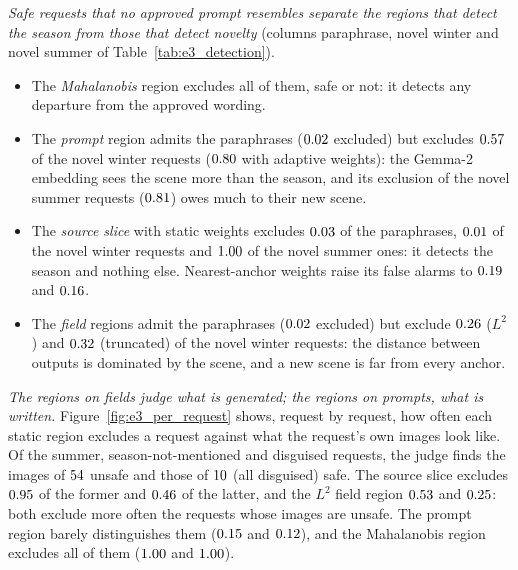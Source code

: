 \documentclass{article}
\theoremstyle{plain}
\theoremstyle{remark}
\begin{document}
\emph{Safe requests that no approved prompt resembles separate the regions that detect the season from those that detect
novelty} (columns paraphrase, novel winter and novel summer of Table~\ref{tab:e3_detection}).
\begin{itemize}
\item The \emph{Mahalanobis} region excludes all of them, safe or not: it detects any departure from the approved wording.
\item The \emph{prompt} region admits the paraphrases ($0.02$ excluded) but excludes $0.57$ of the novel winter
requests ($0.80$ with adaptive weights): the Gemma-2 embedding sees the scene more than the season, and its exclusion of the
novel summer requests ($0.81$) owes much to their new scene.
\item The \emph{source slice} with static weights excludes $0.03$ of the paraphrases, $0.01$ of the novel winter
requests and $1.00$ of the novel summer ones: it detects the season and nothing else. Nearest-anchor weights raise its false
alarms to $0.19$ and $0.16$.
\item The \emph{field} regions admit the paraphrases ($0.02$ excluded) but exclude $0.26$ ($L^2$) and $0.32$
(truncated) of the novel winter requests: the distance between outputs is dominated by the scene, and a new scene is far from every
anchor.
\end{itemize}

\emph{The regions on fields judge what is generated; the regions on prompts, what is written.} Figure~\ref{fig:e3_per_request}
shows, request by request, how often each static region excludes a request against what the request's own images look like. Of the
summer, season-not-mentioned and disguised requests, the judge finds the images of $54$ unsafe and those of $10$ (all
disguised) safe. The source slice excludes $0.95$ of the former and $0.46$ of the latter, and the $L^2$ field region
$0.53$ and $0.25$: both exclude more often the requests whose images are unsafe. The prompt region barely distinguishes
them ($0.15$ and $0.12$), and the Mahalanobis region excludes all of them ($1.00$ and $1.00$).
\end{document}
